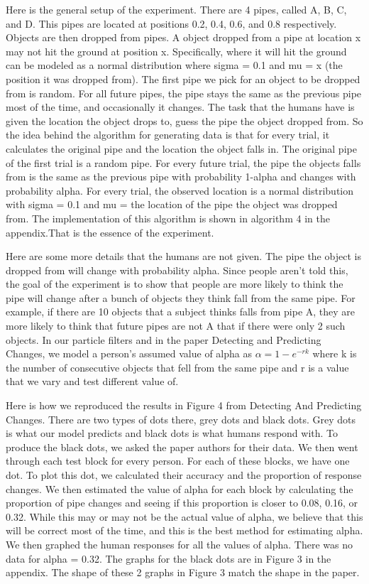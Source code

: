 \documentclass[12pt,letterpaper]{article}
\begin{document}
Here is the general setup of the experiment. There are 4 pipes, called A, B, C, and D. This pipes are located at positions 0.2, 0.4, 0.6, and 0.8 respectively. Objects are then dropped from pipes. A object dropped from a pipe at location x may not hit the ground at position x. Specifically, where it will hit the ground can be modeled as a normal distribution where sigma = 0.1 and mu = x (the position it was dropped from). The first pipe we pick for an object to be dropped from is random. For all future pipes, the pipe stays the same as the previous pipe most of the time, and occasionally it changes. The task that the humans have is given the location the object drops to, guess the pipe the object dropped from. So the idea behind the algorithm for generating data is that for every trial, it calculates the original pipe and the location the object falls in. The original pipe of the first trial is a random pipe. For every future trial, the pipe the objects falls from is the same as the previous pipe with probability 1-alpha and changes with probability alpha. For every trial, the observed location is a normal distribution with sigma = 0.1 and mu = the location of the pipe the object was dropped from. The implementation of this algorithm is shown in algorithm 4 in the appendix.That is the essence of the experiment.

Here are some more details that the humans are not given. The pipe the object is dropped from will change with probability alpha. Since people aren't told this, the goal of the  experiment is to show that people are more likely to think the pipe will change after a bunch of objects they think fall from the same pipe. For example, if there are 10 objects that a subject thinks falls from pipe A, they are more likely to think that future pipes are not A that if there were only 2 such objects. In our particle filters and in the paper Detecting and Predicting Changes, we model a person's assumed value of alpha as $\alpha = 1-e^{-rk}$ where k is the number of consecutive objects that fell from the same pipe and r is a value that we vary and test different value of.

Here is how we reproduced the results in Figure 4 from Detecting And Predicting Changes. There are two types of dots there, grey dots and black dots. Grey dots is what our model predicts and black dots is what humans respond with. To produce the black dots, we asked the paper authors for their data. We then went through each test block for every person. For each of these blocks, we have one dot. To plot this dot, we calculated their accuracy and the proportion of response changes. We then estimated the value of alpha for each block by calculating the proportion of pipe changes and seeing if this proportion is closer to 0.08, 0.16, or 0.32. While this may or may not be the actual value of alpha, we believe that this will be correct most of the time, and this is the best method for estimating alpha. We then graphed the human responses for all the values of alpha. There was no data for alpha = 0.32. The graphs for the black dots are in Figure 3 in the appendix. The shape of these 2 graphs in Figure 3 match the shape in the paper.
\end{document}
